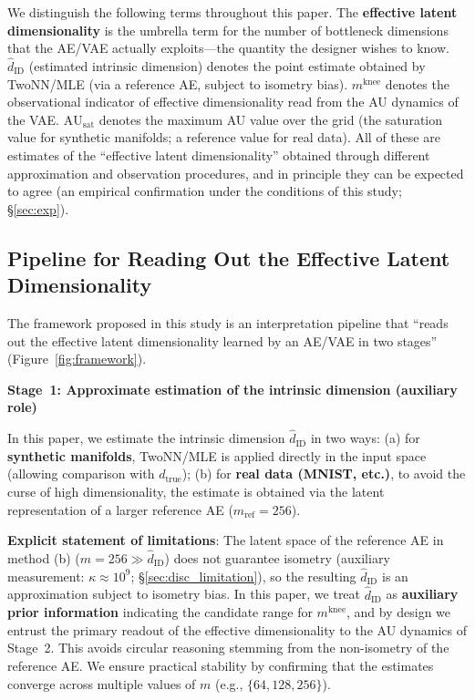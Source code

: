 \documentclass[make,article,submit,pdftex,moreauthors]{Definitions/mdpi}
\newcommand{\dtrue}{d_{\mathrm{true}}}
\newcommand{\kap}{\kappa}
\newcommand{\AUsat}{\mathrm{AU}_{\mathrm{sat}}}
\newcommand{\mknee}{m^{\mathrm{knee}}}
\begin{document}
\begin{Remark}[Terminology]
We distinguish the following terms throughout this paper.
The \textbf{effective latent dimensionality} is the umbrella term for the number of
bottleneck dimensions that the AE/VAE actually exploits---the quantity the
designer wishes to know.
\textbf{$\hat{d}_\mathrm{ID}$} (estimated intrinsic dimension) denotes the point estimate
obtained by TwoNN/MLE (via a reference AE, subject to isometry bias).
\textbf{$\mknee$} denotes the observational indicator of effective dimensionality
read from the AU dynamics of the VAE.
\textbf{$\AUsat$} denotes the maximum AU value over the grid (the saturation value
for synthetic manifolds; a reference value for real data).
All of these are estimates of the ``effective latent dimensionality'' obtained through
different approximation and observation procedures, and in principle they can be
expected to agree (an empirical confirmation under the conditions of this study;
§\ref{sec:exp}).
\end{Remark}

\subsection{Pipeline for Reading Out the Effective Latent Dimensionality}\label{sec:framework_pipeline}

The framework proposed in this study is an interpretation pipeline that
``reads out the effective latent dimensionality learned by an AE/VAE in two
stages'' (Figure~\ref{fig:framework}).

\textbf{Stage~1: Approximate estimation of the intrinsic dimension (auxiliary role)}

In this paper, we estimate the intrinsic dimension $\hat{d}_\mathrm{ID}$ in two ways:
(a) for \textbf{synthetic manifolds}, TwoNN/MLE is applied directly in the input
space (allowing comparison with $\dtrue$);
(b) for \textbf{real data (MNIST, etc.)}, to avoid the curse of high
dimensionality, the estimate is obtained via the latent representation of a
larger reference AE ($m_{\mathrm{ref}} = 256$).

\textbf{Explicit statement of limitations}: The latent space of the reference AE
in method (b) ($m = 256 \gg \hat{d}_\mathrm{ID}$) does not guarantee isometry
(auxiliary measurement: $\kap \approx 10^9$; §\ref{sec:disc_limitation}),
so the resulting $\hat{d}_\mathrm{ID}$ is an approximation subject to isometry bias.
In this paper, we treat $\hat{d}_\mathrm{ID}$ as \textbf{auxiliary prior information}
indicating the candidate range for $\mknee$, and by design we entrust the primary
readout of the effective dimensionality to the AU dynamics of Stage~2.
This avoids circular reasoning stemming from the non-isometry of the reference AE.
We ensure practical stability by confirming that the estimates converge across
multiple values of $m$ (e.g., $\{64, 128, 256\}$).
\end{document}
